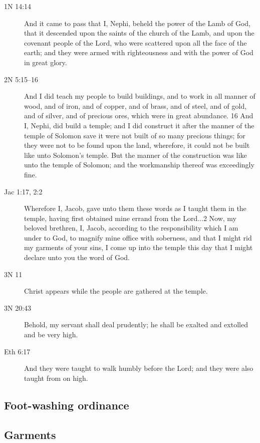 		\begin{description}
		\item[1N 14:14] And it came to pass that I, Nephi, beheld the power of the Lamb of God, that it descended upon the saints of the church of the Lamb, and upon the covenant people of the Lord, who were scattered upon all the face of the earth; and they were armed with righteousness and with the power of God in great glory.
		\item[2N 5:15--16] And I did teach my people to build buildings, and to work in all manner of wood, and of iron, and of copper, and of brass, and of steel, and of gold, and of silver, and of precious ores, which were in great abundance. 16 And I, Nephi, did build a temple; and I did construct it after the manner of the temple of Solomon save it were not built of so many precious things; for they were not to be found upon the land, wherefore, it could not be built like unto Solomon's temple. But the manner of the construction was like unto the temple of Solomon; and the workmanship thereof was exceedingly fine.
		\item[Jac 1:17, 2:2] Wherefore I, Jacob, gave unto them these words as I taught them in the temple, having first obtained mine errand from the Lord...2 Now, my beloved brethren, I, Jacob, according to the responsibility which I am under to God, to magnify mine office with soberness, and that I might rid my garments of your sins, I come up into the temple this day that I might declare unto you the word of God.
		\item[3N 11] Christ appears while the people are gathered at the temple.
		\item[3N 20:43] Behold, my servant shall deal prudently; he shall be exalted and extolled and be very high.
		\item[Eth 6:17] And they were taught to walk humbly before the Lord; and they were also taught from on high.
		\end{description} 
		
	\subsection{Foot-washing ordinance}

	\subsection{Garments} %

